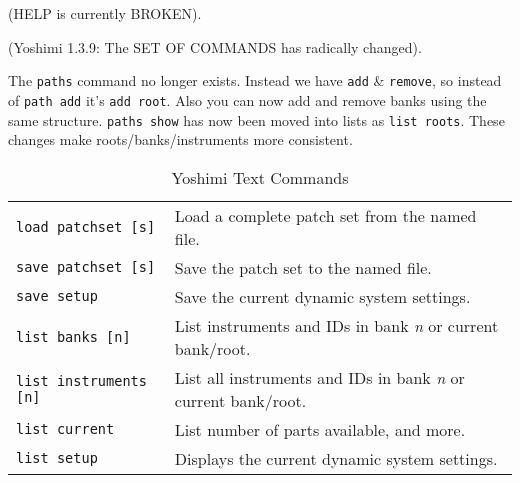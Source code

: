    (HELP is currently BROKEN).

   (Yoshimi 1.3.9: The SET OF COMMANDS has radically changed).

   The \texttt{paths} command no longer exists. Instead we have \texttt{add} \&
   \texttt{remove}, so instead of \texttt{path add} it's \texttt{add root}. Also
   you can now add and remove banks using the same structure. \texttt{paths
   show} has now been moved into lists as \texttt{list roots}.  These changes
   make roots/banks/instruments more consistent.

   \begin{table}[H]
      \centering
      \caption{Yoshimi Text Commands}
      \label{table:yoshimi_text_commands}
      \begin{tabular}{l l}

         \texttt{load patchset [s]} &
            Load a complete patch set from the named file. \\

         \texttt{save patchset [s]} &
            Save the patch set to the named file. \\

         \texttt{save setup} &
            Save the current dynamic system settings. \\

%
%

         \texttt{list banks [n]} &
            List instruments and IDs in bank \textsl{n} or
            current bank/root. \\

         \texttt{list instruments [n]} &
            List all instruments and IDs in bank \textsl{n}
            or current bank/root. \\

         \texttt{list current} &
            List number of parts available, and more. \\

         \texttt{list setup} &
            Displays the current dynamic system settings. \\


\end{tabular}
\end{table}
